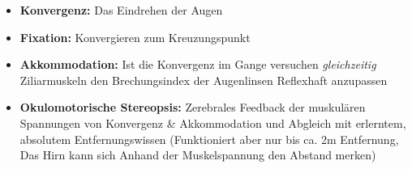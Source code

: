 \begin{itemize}

\item \textbf{Konvergenz:} Das Eindrehen der Augen
\item \textbf{Fixation:} Konvergieren zum Kreuzungspunkt
\item \textbf{Akkommodation:} Ist die Konvergenz im Gange versuchen \textit{gleichzeitig} Ziliarmuskeln den Brechungsindex der Augenlinsen Reflexhaft anzupassen
\item \textbf{Okulomotorische Stereopsis:} Zerebrales Feedback der muskulären Spannungen von Konvergenz \&	Akkommodation und Abgleich mit erlerntem, absolutem Entfernungswissen (Funktioniert aber nur bis ca. 2m Entfernung, Das Hirn kann sich Anhand der Muskelspannung den Abstand merken)

\end{itemize}







